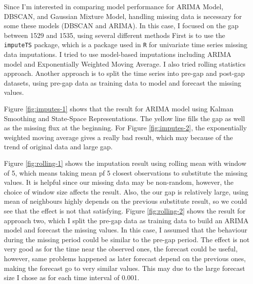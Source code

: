 \documentclass[
]{article}
\begin{document}
Since I'm interested in comparing model performance for ARIMA Model, DBSCAN, and Gaussian Mixture Model, handling missing data is necessary for some these models (DBSCAN and ARIMA). In this case, I focused on the gap between 1529 and 1535, using several different methods First is to use the \texttt{imputeTS} package, which is a package used in \texttt{R} for univariate time series missing data imputations. I tried to use model-based imputations including ARIMA model and Exponentially Weighted Moving Average. I also tried rolling statistics approach. Another approach is to split the time series into pre-gap and post-gap datasets, using pre-gap data as training data to model and forecast the missing values.

Figure \ref{fig:imputes-1} shows that the result for ARIMA model using Kalman Smoothing and State-Space Representations. The yellow line fills the gap as well as the missing flux at the beginning. For Figure \ref{fig:imputes-2}, the exponentially weighted moving average gives a really bad result, which may because of the trend of original data and large gap.

Figure \ref{fig:rolling-1} shows the imputation result using rolling mean with window of 5, which means taking mean pf 5 closest observations to substitute the missing values. It is helpful since our missing data may be non-random, however, the choice of window size affects the result. Also, the our gap is relatively large, using mean of neighbours highly depends on the previous substitute result, so we could see that the effect is not that satisfying. Figure \ref{fig:rolling-2} shows the result for approach two, which I split the pre-gap data as training data to build an ARIMA model and forecast the missing values. In this case, I assumed that the behaviour during the missing period could be similar to the pre-gap period. The effect is not very good as for the time near the observed ones, the forecast could be useful, however, same problems happened as later forecast depend on the previous ones, making the forecast go to very similar values. This may due to the large forecast size I chose as for each time interval of 0.001.
\end{document}
